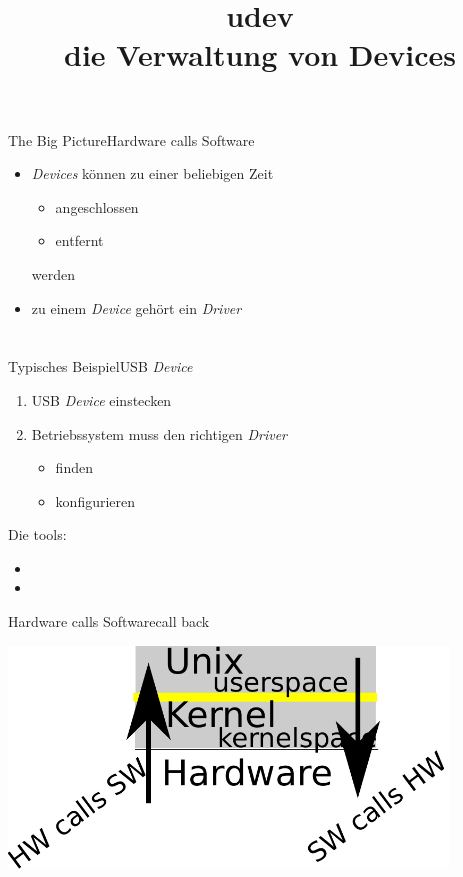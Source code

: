 \documentclass{beamer}
\begin{document}
\title[udev]{udev\\die Verwaltung von Devices}

\frame{\titlepage}

\begin{frame}{The Big Picture}{Hardware calls Software}
 \begin{itemize}
  \item {\em Devices} können zu einer beliebigen Zeit 
  \begin{itemize}
   \item angeschlossen
   \item entfernt
  \end{itemize}
  werden
  \item zu einem {\em Device} gehört ein {\em Driver}
 \end{itemize}
\end{frame}


\section{\host}
\begin{frame}[fragile]{Typisches Beispiel}{USB {\em Device}}
 \begin{enumerate}
  \item USB {\em Device} einstecken
  \item Betriebssystem muss den richtigen {\em Driver}
  \begin{itemize}
   \item finden
   \item konfigurieren
  \end{itemize}
 \end{enumerate}
 \begin{block}{Die tools:}
 \begin{itemize}
  \item {}
  \item {}
 \end{itemize}
 \end{block}
\end{frame}

\begin{frame}{Hardware calls Software}{call back}
\begin{center}
\includegraphics[width=0.875\textwidth]{hw-calls-sw.pdf}
\end{center}
\end{frame}
\end{document}
